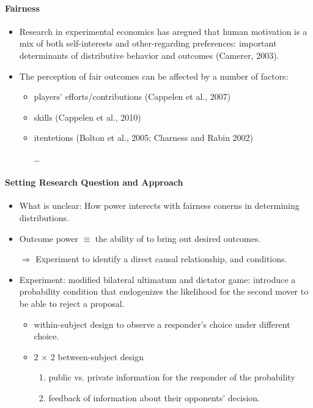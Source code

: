 \documentclass[../root]{subfiles}
\begin{document}
    \paragraph{Fairness}

    \begin{itemize}
      \item Research in experimental economics has aregued that human motivation is a mix of both self-interests and other-regarding preferences: important determinants of distributive behavior and outcomes (Camerer, 2003).
      \item The perception of fair outcomes can be affected by a number of factors:
      \begin{itemize}
        \item players' efforts/contributions (Cappelen et al., 2007)
        \item skills (Cappelen et al., 2010)
        \item itentetions (Bolton et al., 2005; Charness and Rabin 2002)

        \ldots
      \end{itemize}
    \end{itemize}

    \paragraph{Setting Research Question and Approach}

    \begin{itemize}
      \item What is unclear: How power interects with fairness conerns in determining distributions.
      \item Outcome power $\equiv$ the ability of to bring out desired outcomes.

      $\Rightarrow$ Experiment to identify a direct causal relationship, and conditions.
      \item Experiment: modified bilateral ultimatum and dictator game: introduce a probability condition that endogenizes the likelihood for the second mover to be able to reject a proposal.
      \begin{itemize}
        \item within-subject design to observe a responder's choice under different choice.
        \item 2 $\times$ 2 between-subject design
        \begin{enumerate}
          \item public vs. private information for the responder of the probability
          \item feedback of information about their opponents' decision.
        \end{enumerate}
      \end{itemize}
    \end{itemize}
\end{document}
